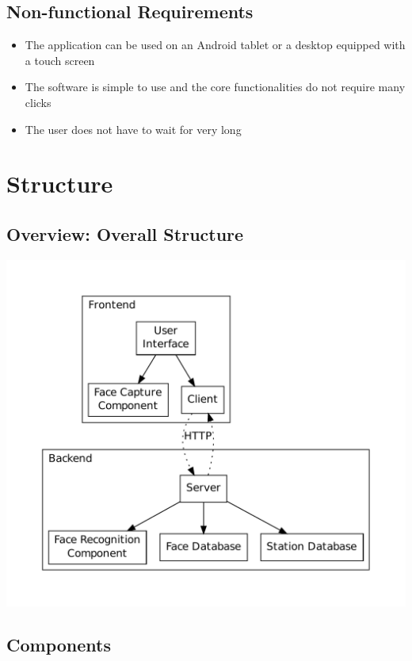 \documentclass[11pt]{article}
\begin{document}
\subsection{Non-functional Requirements}

\begin{itemize}
\item{The application can be used on an Android tablet or a desktop equipped with a touch screen}
\item{The software is simple to use and the core functionalities do not require many clicks}
\item{The user does not have to wait for very long}  
\end{itemize}

\section{Structure}

\subsection{Overview: Overall Structure}
\includegraphics[scale=0.5]{components.pdf}


\subsection{Components}
\end{document}
